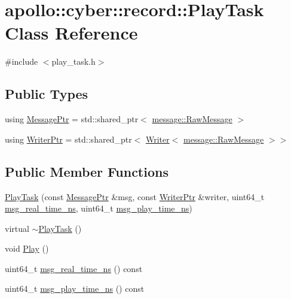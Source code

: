 \hypertarget{classapollo_1_1cyber_1_1record_1_1PlayTask}{\section{apollo\-:\-:cyber\-:\-:record\-:\-:Play\-Task Class Reference}
\label{classapollo_1_1cyber_1_1record_1_1PlayTask}
}


{\ttfamily \#include $<$play\-\_\-task.\-h$>$}

\subsection*{Public Types}
\begin{DoxyCompactItemize}
\item 
using \hyperlink{classapollo_1_1cyber_1_1record_1_1PlayTask_a77f6d771bbb5a21c67a533a3c36efb77}{Message\-Ptr} = std\-::shared\-\_\-ptr$<$ \hyperlink{structapollo_1_1cyber_1_1message_1_1RawMessage}{message\-::\-Raw\-Message} $>$
\item 
using \hyperlink{classapollo_1_1cyber_1_1record_1_1PlayTask_ab836ae21967a8fc00e1b556152bbfc9a}{Writer\-Ptr} = std\-::shared\-\_\-ptr$<$ \hyperlink{classapollo_1_1cyber_1_1Writer}{Writer}$<$ \hyperlink{structapollo_1_1cyber_1_1message_1_1RawMessage}{message\-::\-Raw\-Message} $>$$>$
\end{DoxyCompactItemize}
\subsection*{Public Member Functions}
\begin{DoxyCompactItemize}
\item 
\hyperlink{classapollo_1_1cyber_1_1record_1_1PlayTask_aabfe95d4b9fe2bf8be17b70af9d8cb1e}{Play\-Task} (const \hyperlink{classapollo_1_1cyber_1_1record_1_1PlayTask_a77f6d771bbb5a21c67a533a3c36efb77}{Message\-Ptr} \&msg, const \hyperlink{classapollo_1_1cyber_1_1record_1_1PlayTask_ab836ae21967a8fc00e1b556152bbfc9a}{Writer\-Ptr} \&writer, uint64\-\_\-t \hyperlink{classapollo_1_1cyber_1_1record_1_1PlayTask_ab0eab97ac4bea60ce30f5e1809c37be1}{msg\-\_\-real\-\_\-time\-\_\-ns}, uint64\-\_\-t \hyperlink{classapollo_1_1cyber_1_1record_1_1PlayTask_adeb245b818b190947264ed04ab7c1d77}{msg\-\_\-play\-\_\-time\-\_\-ns})
\item 
virtual \hyperlink{classapollo_1_1cyber_1_1record_1_1PlayTask_a1e38b526d329a121ddc24d899d38ec94}{$\sim$\-Play\-Task} ()
\item 
void \hyperlink{classapollo_1_1cyber_1_1record_1_1PlayTask_aba31dc77d54fcd939a16263b5f6b951f}{Play} ()
\item 
uint64\-\_\-t \hyperlink{classapollo_1_1cyber_1_1record_1_1PlayTask_ab0eab97ac4bea60ce30f5e1809c37be1}{msg\-\_\-real\-\_\-time\-\_\-ns} () const 
\item 
uint64\-\_\-t \hyperlink{classapollo_1_1cyber_1_1record_1_1PlayTask_adeb245b818b190947264ed04ab7c1d77}{msg\-\_\-play\-\_\-time\-\_\-ns} () const 
\end{DoxyCompactItemize}
